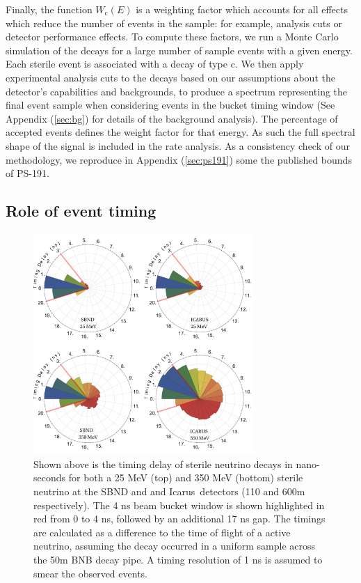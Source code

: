 \documentclass[11pt, a4paper]{article}
\def\icarus{Icarus}
\begin{document}
%
Finally, the function $W_\text{c}(E)$ is a weighting factor which accounts for
all effects which reduce the number of events in the sample: for example,
analysis cuts or detector performance effects.
%
To compute these factors, we run a Monte Carlo simulation of the decays for a
large number of sample events with a given energy. Each sterile event is
associated with a decay of type $\text{c}$. We then apply experimental analysis
cuts to the decays based on our assumptions about the detector's capabilities
and backgrounds, to produce a spectrum representing the final event sample when considering events in the bucket timing window (See Appendix (\ref{sec:bg}) for details of the background analysis). The percentage of accepted events defines the weight factor for that energy. As such the full spectral shape of the signal is included in the rate analysis. As a consistency check of our methodology, we reproduce in Appendix (\ref{sec:ps191}) some the published bounds of PS-191. 

\subsection{\label{sec:timing}Role of event timing}

\begin{figure}[t]
%
\center
%
\includegraphics[width=0.75\textwidth]{figures/timing.pdf}
%
\caption{\label{fig:timing} Shown above is the timing delay of sterile neutrino
decays in nano-seconds for both a 25 MeV (top) and 350 MeV (bottom) sterile
neutrino at the SBND and and \icarus\ detectors (110 and 600m
respectively). The 4 ns beam bucket window is shown highlighted in red from 0
to 4 ns, followed by an additional 17 ns gap. The timings are calculated as a
difference to the time of flight of a active neutrino, assuming the decay
occurred in a uniform sample across the 50m BNB decay pipe. A timing resolution
of 1 ns is assumed to smear the observed events. }
%
\end{figure}
\end{document}
